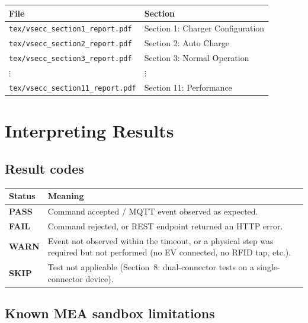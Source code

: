\documentclass[11pt, a4paper]{article}
\begin{document}
\begin{center}
\begin{tabular}{ll}
\toprule
\textbf{File} & \textbf{Section} \\
\midrule
\texttt{tex/vsecc\_section1\_report.pdf}  & Section 1: Charger Configuration \\
\texttt{tex/vsecc\_section2\_report.pdf}  & Section 2: Auto Charge \\
\texttt{tex/vsecc\_section3\_report.pdf}  & Section 3: Normal Operation \\
$\vdots$ & $\vdots$ \\
\texttt{tex/vsecc\_section11\_report.pdf} & Section 11: Performance \\
\bottomrule
\end{tabular}
\end{center}

\section{Interpreting Results}

\subsection{Result codes}

\begin{center}
\begin{tabular}{C{2cm} L{11cm}}
\toprule
\textbf{Status} & \textbf{Meaning} \\
\midrule
\textcolor{passgreen}{\textbf{PASS}} &
  Command accepted / MQTT event observed as expected. \\
\textcolor{failred}{\textbf{FAIL}} &
  Command rejected, or REST endpoint returned an HTTP error. \\
\textcolor{warnorange}{\textbf{WARN}} &
  Event not observed within the timeout, or a physical step was required
  but not performed (no EV connected, no RFID tap, etc.). \\
\textcolor{skipgray}{\textbf{SKIP}} &
  Test not applicable (Section~8: dual-connector tests on a
  single-connector device). \\
\bottomrule
\end{tabular}
\end{center}

\subsection{Known MEA sandbox limitations}
\end{document}
